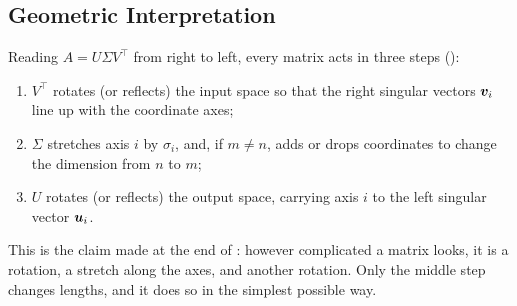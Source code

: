 \subsection{Geometric Interpretation}
\label{sec:ch04-svd-geometry}

Reading $A = U\Sigma V^\top$ from right to left, every matrix acts in three
steps ():
\begin{enumerate}
  \item $V^\top$ rotates (or reflects) the input space so that the right
    singular vectors $\bm{v}_i$ line up with the coordinate axes;
  \item $\Sigma$ stretches axis $i$ by $\sigma_i$, and, if $m \ne n$, adds
    or drops coordinates to change the dimension from $n$ to $m$;
  \item $U$ rotates (or reflects) the output space, carrying axis $i$ to
    the left singular vector $\bm{u}_i$.
\end{enumerate}
This is the claim made at the end of :
however complicated a matrix looks, it is a rotation, a stretch along the
axes, and another rotation. Only the middle step changes lengths, and it
does so in the simplest possible way.

